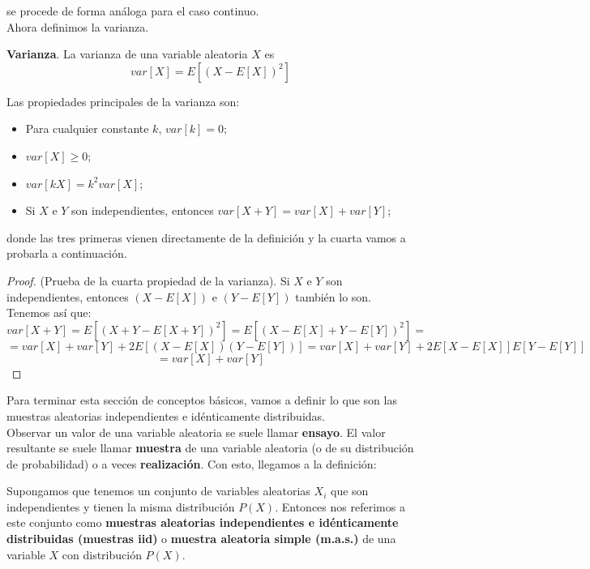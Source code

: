 se procede de forma análoga para el caso continuo.\\
Ahora definimos la varianza.
\begin{definicion}
\textbf{Varianza}. La varianza de una variable aleatoria $X$ es
\[ var[X]=E[(X-E[X])^{2}] \]
\end{definicion}
Las propiedades principales de la varianza son:
\begin{itemize}
 \item Para cualquier constante $k$, $var[k]=0$;
 \item $var[X] \geq 0$;
 \item $var[kX]=k^{2}var[X]$;
 \item Si $X$ e $Y$ son independientes, entonces $var[X+Y]=var[X]+var[Y]$;
\end{itemize}
donde las tres primeras vienen directamente de la definición y la cuarta vamos a probarla a continuación.
\begin{proof}
(Prueba de la cuarta propiedad de la varianza). Si $X$ e $Y$ son independientes, entonces $(X-E[X])$ e $(Y-E[Y])$ también lo son. Tenemos así que:
\[ var[X+Y]=E[(X+Y-E[X+Y])^{2}]=E[(X-E[X]+Y-E[Y])^{2}]= \]
\[ =var[X]+var[Y]+2E[(X-E[X])(Y-E[Y])]=var[X]+var[Y]+2E[X-E[X]]E[Y-E[Y]] \]
\[ =var[X]+var[Y] \]
\end{proof}
Para terminar esta sección de conceptos básicos, vamos a definir lo que son las muestras aleatorias independientes e idénticamente distribuidas.\\
Observar un valor de una variable aleatoria se suele llamar \textbf{ensayo}. El valor resultante se suele llamar \textbf{muestra} de una variable aleatoria (o de su distribución de probabilidad) o a veces \textbf{realización}. Con esto, llegamos a la definición:
\begin{definicion}
Supongamos que tenemos un conjunto de variables aleatorias $X_{i}$ que son independientes y tienen la misma distribución $P(X)$. Entonces nos referimos a este conjunto como \textbf{muestras aleatorias independientes e idénticamente distribuidas (muestras iid)} o \textbf{muestra aleatoria simple (m.a.s.)} de una variable $X$ con distribución $P(X)$.
\end{definicion}
\cite{forsyth2018probability}
